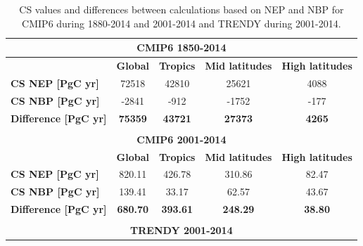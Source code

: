 \documentclass[9pt,twoside,lineno]{pnas-new_SI}
\begin{document}
\begin{table}[H]
\label{Table:CSdiff_NEP_NBP}
\caption{CS values and differences between calculations based on NEP and NBP for CMIP6 during 1880-2014 and 2001-2014 and TRENDY during 2001-2014.}
\centering
\begin{tabular}{lcccc}
\hline
\multicolumn{5}{c}{\textbf{CMIP6 1850-2014}}                                                                                       \\ \hline
\textbf{}                         & \textbf{Global}      & \textbf{Tropics}     & \textbf{Mid latitudes} & \textbf{High latitudes} \\
\textbf{CS NEP {[}PgC yr{]}}      & 72518              & 42810              & 25621                & 4088                 \\
\textbf{CS NBP {[}PgC yr{]}}      & -2841             & -912             & -1752               & -177               \\ \hline
\textbf{Difference  {[}PgC yr{]}} & \textbf{75359}     & \textbf{43721}     & \textbf{27373}       & \textbf{4265}        \\ \hline
                                  & \multicolumn{1}{l}{} & \multicolumn{1}{l}{} & \multicolumn{1}{l}{}   & \multicolumn{1}{l}{}    \\ \hline
\multicolumn{5}{c}{\textbf{CMIP6 2001-2014}}                                                                                       \\ \hline
\textbf{}                         & \textbf{Global}      & \textbf{Tropics}     & \textbf{Mid latitudes} & \textbf{High latitudes} \\
\textbf{CS NEP {[}PgC yr{]}}      & 820.11               & 426.78               & 310.86                 & 82.47                   \\
\textbf{CS NBP {[}PgC yr{]}}      & 139.41               & 33.17                & 62.57                  & 43.67                   \\
\textbf{Difference  {[}PgC yr{]}} & \textbf{680.70}      & \textbf{393.61}      & \textbf{248.29}        & \textbf{38.80}          \\ \hline
                                  & \multicolumn{1}{l}{} & \multicolumn{1}{l}{} & \multicolumn{1}{l}{}   & \multicolumn{1}{l}{}    \\ \hline
\multicolumn{5}{c}{\textbf{TRENDY 2001-2014}}                                                                                      \\ \hline

\end{tabular}
\end{table}
\end{document}
